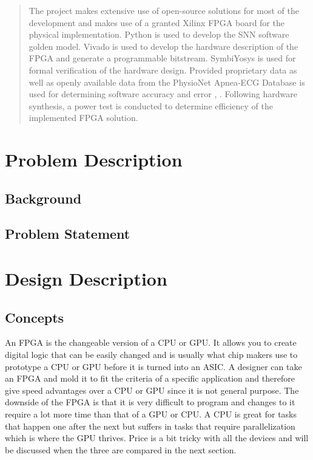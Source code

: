 \documentclass[12pt,titlepage]{article}
\begin{document}
\begin{abstract}
The project makes extensive use of open-source solutions for most of the development and makes use of a granted Xilinx FPGA board for the physical
implementation. Python is used to develop the SNN software golden model. Vivado is used to develop the hardware description of the FPGA and
generate a programmable bitstream. SymbiYosys is used for formal verification of the hardware design. Provided proprietary data as well as openly
available data from the PhysioNet Apnea-ECG Database is used for determining software accuracy and error \cite{penzel}, \cite{physiobank}. Following
hardware synthesis, a power test is conducted to determine efficiency of the implemented FPGA solution.
\end{abstract}

\tableofcontents

\listoffigures

\listoftables

\section{Problem Description}
\subsection{Background}
\subsection{Problem Statement}

\section{Design Description}
\subsection{Concepts}
An FPGA is the changeable version of a CPU or GPU. It allows you to create digital logic that can be easily changed and is usually what chip makers
use to prototype a CPU or GPU before it is turned into an ASIC. A designer can take an FPGA and mold it to fit the criteria of a specific application
and therefore give speed advantages over a CPU or GPU since it is not general purpose. The downside of the FPGA is that it is very difficult to program
and changes to it require a lot more time than that of a GPU or CPU. A CPU is great for tasks that happen one after the next but suffers in tasks that
require parallelization which is where the GPU thrives. Price is a bit tricky with all the devices and will be discussed when the three are compared in
the next section.
\end{document}
